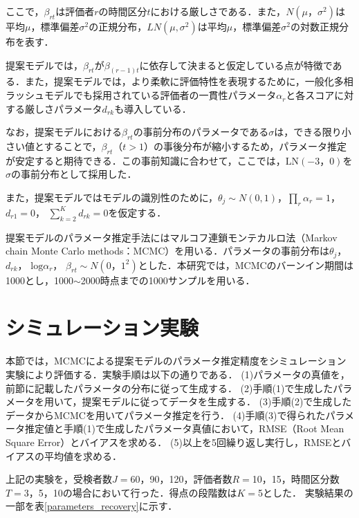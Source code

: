 \documentclass[dvipdfmx, twocolumn, a4paper]{hcresume}
\begin{document}
ここで，$\beta_{rt}$は評価者$r$の時間区分$t$における厳しさである．また，$N(\mu，\sigma^2)$は平均$\mu$，標準偏差$\sigma^2$の正規分布，$LN(\mu,\sigma^2)$は平均$\mu$，標準偏差$\sigma^2$の対数正規分布を表す．

提案モデルでは，$\beta_{rt}$が$\beta_{(r-1)t}$に依存して決まると仮定している点が特徴である．また，提案モデルでは，より柔軟に評価特性を表現するために，一般化多相ラッシュモデルでも採用されている評価者の一貫性パラメータ$\alpha_r$と各スコアに対する厳しさパラメータ$d_{rk}$も導入している．

なお，提案モデルにおける$\beta_{rt}$の事前分布のパラメータである$\sigma$は，できる限り小さい値とすることで，$\beta_{rt}（t>1）$の事後分布が縮小するため，パラメータ推定が安定すると期待できる．この事前知識に合わせて，ここでは，$\mathrm{LN}(-3，0)$を$\sigma$の事前分布として採用した．

また，提案モデルではモデルの識別性のために，$\theta_{j}\sim N(0,1)$，$\prod_{r}\alpha_r=1$， $d_{r1}=0$， $\sum_{k=2}^{K}d_{rk}=0$を仮定する．

提案モデルのパラメータ推定手法にはマルコフ連鎖モンテカルロ法（Markov chain Monte Carlo methods：MCMC）を用いる．パラメータの事前分布は$\theta_{j}$， $d_{rk}$， $\mathrm{log}\alpha_{r}$， $\beta_{rt}\sim N(0，1^{2})$とした．本研究では，MCMCのバーンイン期間は1000とし，1000$\sim$2000時点までの1000サンプルを用いる．
\section{シミュレーション実験}

本節では，MCMCによる提案モデルのパラメータ推定精度をシミュレーション実験により評価する．実験手順は以下の通りである．
(1)パラメータの真値を，前節に記載したパラメータの分布に従って生成する．
(2)手順(1)で生成したパラメータを用いて，提案モデルに従ってデータを生成する．
(3)手順(2)で生成したデータからMCMCを用いてパラメータ推定を行う．
(4)手順(3)で得られたパラメータ推定値と手順(1)で生成したパラメータ真値において，RMSE（Root Mean Square Error）とバイアスを求める．
(5)以上を5回繰り返し実行し，RMSEとバイアスの平均値を求める．

上記の実験を，受検者数$J=$60，90，120，評価者数$R=$10，15，時間区分数$T=$3，5，10の場合において行った．得点の段階数は$K=$5とした．
実験結果の一部を表\ref{parameters_recovery}に示す．
\end{document}

